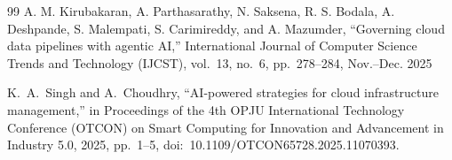 \documentclass[conference]{IEEEtran}
\begin{document}
\begin{thebibliography}{99}
A. M. Kirubakaran, A. Parthasarathy, N. Saksena, R. S. Bodala, A. Deshpande, S. Malempati, S. Carimireddy, and A. Mazumder,
``Governing cloud data pipelines with agentic AI,''
International Journal of Computer Science Trends and Technology (IJCST),
vol.~13, no.~6, pp.~278--284, Nov.--Dec. 2025

K.~A.~Singh and A.~Choudhry,
``AI-powered strategies for cloud infrastructure management,''
in Proceedings of the 4th OPJU International Technology Conference (OTCON) on Smart Computing for Innovation and Advancement in Industry 5.0, 
2025, pp.~1--5,
doi:~10.1109/OTCON65728.2025.11070393.

\end{thebibliography}
\end{document}
